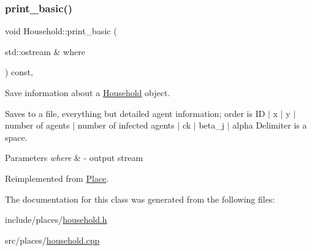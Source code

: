 \mbox{\label{classHousehold_a9bf27cca25dea519945c8740b9793ff6}} 
\subsubsection{\texorpdfstring{print\+\_\+basic()}{print\_basic()}}
{\footnotesize\ttfamily void Household\+::print\+\_\+basic (\begin{DoxyParamCaption}\item[{std\+::ostream \&}]{where }\end{DoxyParamCaption}) const\hspace{0.3cm}{\ttfamily [override]}, {\ttfamily [virtual]}}



Save information about a \hyperlink{classHousehold}{Household} object. 

Saves to a file, everything but detailed agent information; order is ID $\vert$ x $\vert$ y $\vert$ number of agents $\vert$ number of infected agents $\vert$ ck $\vert$ beta\+\_\+j $\vert$ alpha Delimiter is a space.


\begin{DoxyParams}{Parameters}
{\em where} & -\/ output stream \\
\hline
\end{DoxyParams}


Reimplemented from \hyperlink{classPlace_a9aa7649e0b91c5f61a5f71e9ca808fe1}{Place}.



The documentation for this class was generated from the following files\+:\begin{DoxyCompactItemize}
\item 
include/places/\hyperlink{household_8h}{household.\+h}\item 
src/places/\hyperlink{household_8cpp}{household.\+cpp}\end{DoxyCompactItemize}
